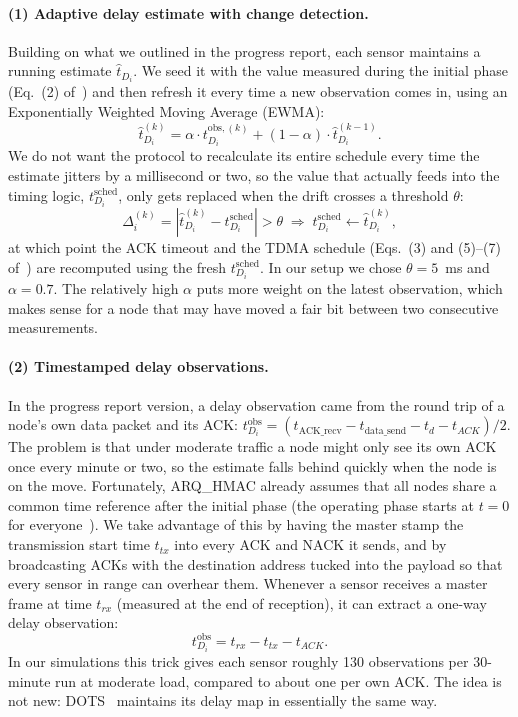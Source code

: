\documentclass{article}
\begin{document}
\paragraph{(1) Adaptive delay estimate with change detection.} Building on what we outlined in the progress report, each sensor maintains a running estimate $\hat{t}_{D_i}$. We seed it with the value measured during the initial phase (Eq.~(2) of~\cite{dao2025}) and then refresh it every time a new observation comes in, using an Exponentially Weighted Moving Average (EWMA):
\begin{equation}
\hat{t}_{D_i}^{(k)} = \alpha \cdot t_{D_i}^{\text{obs},(k)} + (1 - \alpha) \cdot \hat{t}_{D_i}^{(k-1)}.
\label{eq:ewma}
\end{equation}
We do not want the protocol to recalculate its entire schedule every time the estimate jitters by a millisecond or two, so the value that actually feeds into the timing logic, $t_{D_i}^{\text{sched}}$, only gets replaced when the drift crosses a threshold $\theta$:
\begin{equation}
\Delta_i^{(k)} = \left| \hat{t}_{D_i}^{(k)} - t_{D_i}^{\text{sched}} \right| > \theta
\;\Rightarrow\; t_{D_i}^{\text{sched}} \leftarrow \hat{t}_{D_i}^{(k)},
\label{eq:deviation}
\end{equation}
at which point the ACK timeout and the TDMA schedule (Eqs.~(3) and (5)--(7) of~\cite{dao2025}) are recomputed using the fresh $t_{D_i}^{\text{sched}}$. In our setup we chose $\theta = 5$~ms and $\alpha = 0.7$. The relatively high $\alpha$ puts more weight on the latest observation, which makes sense for a node that may have moved a fair bit between two consecutive measurements.

\paragraph{(2) Timestamped delay observations.} In the progress report version, a delay observation came from the round trip of a node's own data packet and its ACK: $t_{D_i}^{\text{obs}} = (t_{\text{ACK\_recv}} - t_{\text{data\_send}} - t_d - t_{ACK})/2$. The problem is that under moderate traffic a node might only see its own ACK once every minute or two, so the estimate falls behind quickly when the node is on the move. Fortunately, ARQ\_HMAC already assumes that all nodes share a common time reference after the initial phase (the operating phase starts at $t = 0$ for everyone~\cite{dao2025}). We take advantage of this by having the master stamp the transmission start time $t_{tx}$ into every ACK and NACK it sends, and by broadcasting ACKs with the destination address tucked into the payload so that every sensor in range can overhear them. Whenever a sensor receives a master frame at time $t_{rx}$ (measured at the end of reception), it can extract a one-way delay observation:
\begin{equation}
t_{D_i}^{\text{obs}} = t_{rx} - t_{tx} - t_{ACK}.
\label{eq:timestamp}
\end{equation}
In our simulations this trick gives each sensor roughly 130 observations per 30-minute run at moderate load, compared to about one per own ACK. The idea is not new: DOTS~\cite{dots2014} maintains its delay map in essentially the same way.
\end{document}
